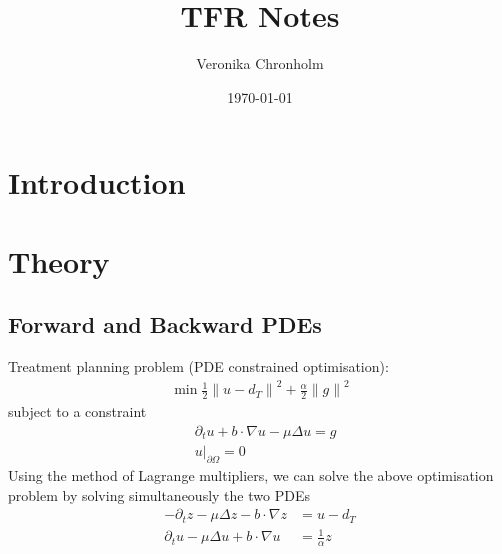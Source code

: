 \documentclass{article}  %
\title{TFR Notes}
\author{Veronika Chronholm}
\date{\today}
\begin{document}
\maketitle

\section{Introduction}

\section{Theory}













\subsection{Forward and Backward PDEs}

Treatment planning problem (PDE constrained optimisation):
%
\begin{align} 
    \min \frac{1}{2} {\lVert u - d_T \rVert}^2 + \frac{\alpha}{2} {\lVert g \rVert}^2
\end{align}
%
subject to a constraint
%
\begin{align} 
    &\partial_t u + b \cdot \nabla u - \mu \Delta u = g\\
    &{u \rvert}_{\partial \Omega} = 0
\end{align}
%
Using the method of Lagrange multipliers, we can solve the above optimisation problem by solving simultaneously the two PDEs
%
\begin{align}
    - \partial_t z - \mu \Delta z - b \cdot \nabla z &= u - d_T\\
    \partial_t u - \mu \Delta u + b \cdot \nabla u &= \frac{1}{\alpha} z 
\end{align}
%
\end{document}
